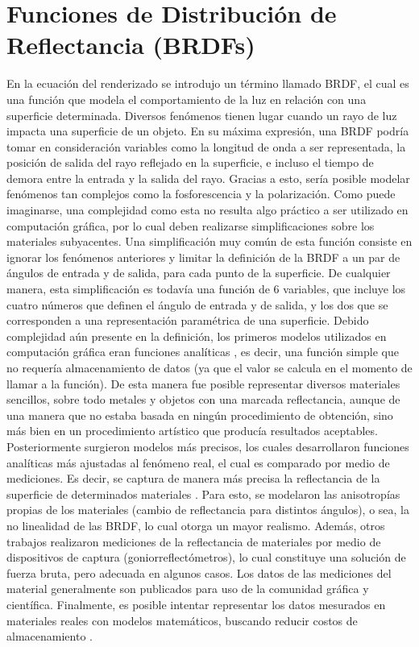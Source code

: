 \section{Funciones de Distribución de Reflectancia (BRDFs)}
En la ecuación del renderizado se introdujo un término llamado BRDF, el cual es una función que modela el comportamiento de la luz en relación con una superficie determinada.
Diversos fenómenos tienen lugar cuando un rayo de luz impacta una superficie de un objeto.
En su máxima expresión, una BRDF podría tomar en consideración variables como la longitud de onda a ser representada, la posición de salida del rayo reflejado en la superficie, e incluso el tiempo de demora entre la entrada y la salida del rayo.
Gracias a esto, sería posible modelar fenómenos tan complejos como la fosforescencia y la polarización.
Como puede imaginarse, una complejidad como esta no resulta algo práctico a ser utilizado en computación gráfica, por lo cual deben realizarse simplificaciones sobre los materiales subyacentes.
Una simplificación muy común de esta función consiste en ignorar los fenómenos anteriores y limitar la definición de la BRDF a un par de ángulos de entrada y de salida, para cada punto de la superficie.
De cualquier manera, esta simplificación es todavía una función de $6$ variables, que incluye los cuatro números que definen el ángulo de entrada y de salida, y los dos que se corresponden a una representación paramétrica de una superficie.
Debido complejidad aún presente en la definición, los primeros modelos utilizados en computación gráfica eran funciones analíticas \cite{Phong1975,Blinn1977}, es decir, una función simple que no requería almacenamiento de datos (ya que el valor se calcula en el momento de llamar a la función).
De esta manera fue posible representar diversos materiales sencillos, sobre todo metales y objetos con una marcada reflectancia, aunque de una manera que no estaba basada en ningún procedimiento de obtención, sino más bien en un procedimiento artístico que producía resultados aceptables.
Posteriormente surgieron modelos más precisos, los cuales desarrollaron funciones analíticas más ajustadas al fenómeno real, el cual es comparado por medio de mediciones.
Es decir, se captura de manera más precisa la reflectancia de la superficie de determinados materiales \cite{He1991,Ward1992,Lafortune1997}.
Para esto, se modelaron las anisotropías propias de los materiales (cambio de reflectancia para distintos ángulos), o sea, la no linealidad de las BRDF, lo cual otorga un mayor realismo.
Además, otros trabajos \cite{Dana1999,Matusik2003} realizaron mediciones de la reflectancia de materiales por medio de dispositivos de captura (goniorreflectómetros), lo cual constituye una solución de fuerza bruta, pero adecuada en algunos casos.
Los datos de las mediciones del material generalmente son publicados para uso de la comunidad gráfica y científica.
Finalmente, es posible intentar representar los datos mesurados en materiales reales con modelos matemáticos, buscando reducir costos de almacenamiento \cite{Ngan2005}.

